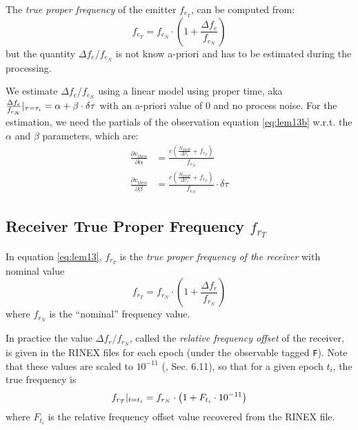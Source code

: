 The \emph{true proper frequency} of the emitter $f_{e_T}$, can be computed 
from:
\begin{equation}
  f_{e_T} = f_{e_N} \cdot \left( 1 + \frac{\Delta f_e}{f_{e_N}} \right)
\end{equation}
but the quantity $\Delta f_e / f_{e_N}$ is not know a-priori and has to be 
estimated during the processing.

We estimate $\Delta f_e / f_{e_N}$ using a \colorbox{blue!20}{linear model using proper time}, 
aka $\frac{\Delta f_e}{f_{e_N}}|_{\tau=\tau _i} = \alpha + \beta \cdot \delta \tau$
with an a-priori value of 0 and no process noise. For the estimation, we need 
the partials of the observation equation \ref{eq:lem13b} w.r.t. the $\alpha$ and 
$\beta$ parameters, which are:
\begin{equation}
  \begin{aligned}
  \frac{\partial v_{theo}}{\partial \alpha} &= 
    \frac{c(\frac{N_{DOP}}{\Delta\tau_r} + f_{r_T})}{f_{e_N}} \\
  \frac{\partial v_{theo}}{\partial \beta} &= 
    \frac{c(\frac{N_{DOP}}{\Delta\tau_r} + f_{r_T})}{f_{e_N}} \cdot \delta \tau
  \end{aligned}
\end{equation}

\subsection{Receiver True Proper Frequency $f_{r_T}$}
\label{ssec:receiver-true-proper-frequency}
In equation \ref{eq:lem13}, $f_{r_T}$ is the \emph{true proper frequency of 
the receiver} with nominal value 
\begin{equation}
  f_{r_T} = f_{r_N} \cdot \left( 1 + \frac{\Delta f_r}{f_{r_N}} \right)
\end{equation}
where $f_{r_N}$ is the ``nominal'' frequency value.

In practice the value $\Delta f_r / f_{r_N}$, called the \emph{relative 
frequency offset} of the receiver, is given in the RINEX files for each epoch 
(under the observable tagged \texttt{F}). Note that these values are scaled to 
$10^{-11}$ (\cite{DORISRNX3}, Sec. 6.11), so that for a given epoch $t_i$, the 
true frequency is
\begin{equation}
  f_{r_T}|_{t=t_i} = f_{r_N} \cdot \left( 1 + F_{t_i} \cdot 10^{-11} \right)
  \label{eq:tpf-rec}
\end{equation}
where $F_{t_i}$ is the relative frequency offset value recovered from the RINEX 
file.

